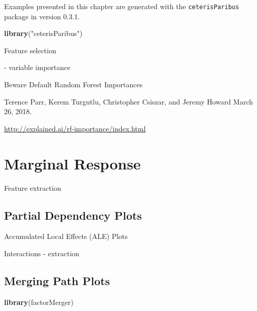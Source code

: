 \documentclass[]{krantz}
\newenvironment{Shaded}{\begin{snugshade}}{\end{snugshade}}
\newcommand{\KeywordTok}[1]{\textcolor[rgb]{0.13,0.29,0.53}{\textbf{#1}}}
\newcommand{\NormalTok}[1]{#1}
\newcommand{\StringTok}[1]{\textcolor[rgb]{0.31,0.60,0.02}{#1}}
\theoremstyle{definition}
\theoremstyle{definition}
\theoremstyle{definition}
\theoremstyle{remark}
\begin{document}
Examples presented in this chapter are generated with the
\texttt{ceterisParibus} package in version 0.3.1.

\begin{Shaded}
\begin{Highlighting}[]
\KeywordTok{library}\NormalTok{(}\StringTok{"ceterisParibus"}\NormalTok{)}
\end{Highlighting}
\end{Shaded}

Feature selection

\citep{Strobl2007} \citep{Strobl2008} - variable importance

\citep{2018arXiv180101489F}

Beware Default Random Forest Importances

Terence Parr, Kerem Turgutlu, Christopher Csiszar, and Jeremy Howard
March 26, 2018.

\url{http://explained.ai/rf-importance/index.html}

\hypertarget{marginal-response}{%
\section{Marginal Response}\label{marginal-response}}

Feature extraction

\hypertarget{partialDependence}{%
\subsection{Partial Dependency Plots}\label{partialDependence}}

\citep{demsar2018}

\citep{RJ2017016} \citep{MAGIX}

Accumulated Local Effects (ALE) Plots \citep{R-ALEPlot}

Interactions - extraction

\hypertarget{merging-path-plots}{%
\subsection{Merging Path Plots}\label{merging-path-plots}}

\citep{R-factorMerger}

\begin{Shaded}
\begin{Highlighting}[]
\KeywordTok{library}\NormalTok{(factorMerger)}
\end{Highlighting}
\end{Shaded}
\end{document}
